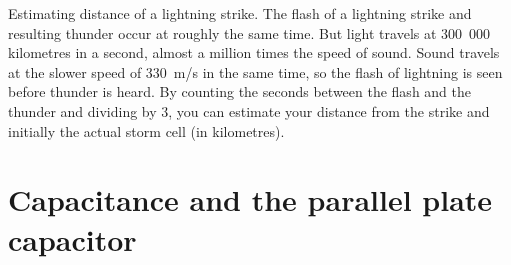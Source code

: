 Estimating distance of a lightning strike. The flash of a
lightning strike and resulting thunder occur at roughly the same
time. But light travels at 300~000 kilometres in a second, almost
a million times the speed of sound. Sound travels at the slower
speed of 330~m/s in the same time, so the flash of lightning is
seen before thunder is heard. By counting the seconds between the
flash and the thunder and dividing by 3, you can estimate your
distance from the strike and initially the actual storm cell (in
kilometres).

\section{Capacitance and the parallel plate capacitor}
\label{p:em:es11:c}


